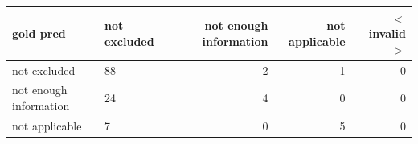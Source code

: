 \begin{tabular}{llrrr}
\toprule
gold  pred & not excluded & not enough information & not applicable & $<$invalid$>$ \\
\midrule
not excluded & 88 & 2 & 1 & 0 \\
not enough information & 24 & 4 & 0 & 0 \\
not applicable & 7 & 0 & 5 & 0 \\
\bottomrule
\end{tabular}

